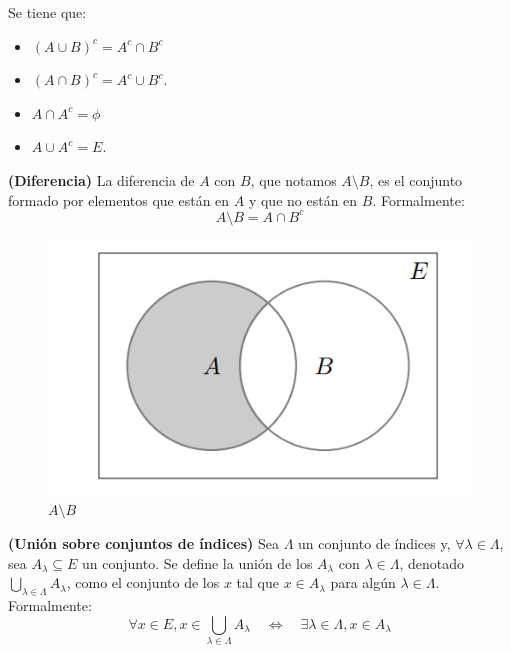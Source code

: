 \begin{proposicion}
	Se tiene que: 
	\begin{itemize}
		\item $(A \cup B)^c = A^c \cap B ^c$ 
		\item $(A \cap B)^c = A^c \cup B^c$. 
		\item $A \cap A^c = \phi$ 
		\item $A \cup A^c = E$. 
	\end{itemize}

\end{proposicion}
\begin{definicion}
	\textbf{(Diferencia)}
	La diferencia de $A$ con $B$, que notamos $A \setminus B$, es el conjunto formado por elementos que están en $A$ y que no están en $B$. Formalmente: 
	$$ A\setminus B = A \cap B ^c $$ 
\end{definicion}

\begin{figure}[H]
	\begin{center}
		\includegraphics[scale=0.8]{figuras/capitulo1/02-conjuntos/diferencia.png}
		\caption{$A\setminus B$}
	\end{center}
\end{figure}

\begin{definicion}
	\textbf{(Unión sobre conjuntos de índices)}
	Sea $\Lambda$ un conjunto de índices y, $\forall \lambda \in \Lambda$, sea $A_\lambda \subseteq E$ un conjunto. Se define la unión de los $A_\lambda$ con $\lambda \in \Lambda$, denotado $\bigcup_{\lambda \in \Lambda} A_\lambda$, como el conjunto de los $x$ tal que $x \in A_\lambda$ para algún $\lambda \in \Lambda$. Formalmente: 
	$$ \forall x \in E , x\in \bigcup_{\lambda \in \Lambda} A_\lambda \quad \iff \quad \exists \lambda \in \Lambda , x \in A_\lambda$$ 
\end{definicion}	

